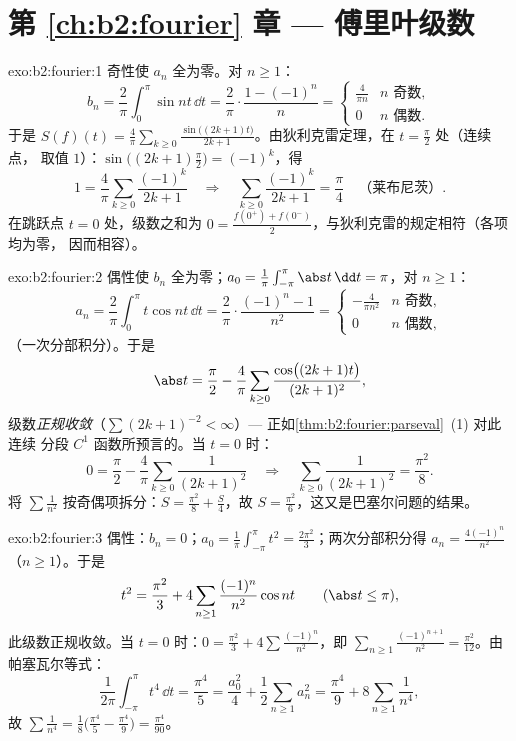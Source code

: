 \section*{第 \ref{ch:b2:fourier} 章 --- 傅里叶级数}

\begin{solution}{exo:b2:fourier:1}
奇性使 $a_n$ 全为零。对 $n \geq 1$：
\[
b_n = \frac{2}{\pi}\int_0^{\pi} \sin nt\,\dd t
= \frac{2}{\pi}\cdot\frac{1 - (-1)^n}{n}
= \begin{cases} \frac{4}{\pi n} & n \text{ 奇数},\\ 0 & n
\text{ 偶数}. \end{cases}
\]
于是 $S(f)(t) = \frac{4}{\pi}\sum_{k\geq0} \frac{\sin\bigl((2k+1)t
\bigr)}{2k+1}$。由狄利克雷定理，在 $t = \frac\pi2$ 处（连续点，
取值 $1$）：$\sin\bigl((2k+1)\frac\pi2\bigr) = (-1)^k$，得
\[
1 = \frac4\pi \sum_{k\geq0}\frac{(-1)^k}{2k+1}
\quad\Longrightarrow\quad
\sum_{k\geq0}\frac{(-1)^k}{2k+1} = \frac{\pi}{4}
\quad\text{（莱布尼茨）}.
\]
在跳跃点 $t = 0$ 处，级数之和为 $0 = \frac{f(0^+) +
f(0^-)}{2}$，与狄利克雷的规定相符（各项均为零，
因而相容）。
\end{solution}

\begin{solution}{exo:b2:fourier:2}
偶性使 $b_n$ 全为零；$a_0 = \frac{1}{\pi}\int_{-\pi}^\pi\abs
t\,\dd t = \pi$，对 $n \geq 1$：
\[
a_n = \frac{2}{\pi}\int_0^\pi t\cos nt\,\dd t
= \frac{2}{\pi}\cdot\frac{(-1)^n - 1}{n^2}
= \begin{cases} -\frac{4}{\pi n^2} & n \text{ 奇数},\\ 0 & n
\text{ 偶数}, \end{cases}
\]
（一次分部积分）。于是
\[
\abs t = \frac{\pi}{2} - \frac{4}{\pi}\sum_{k\geq0}
\frac{\cos\bigl((2k+1)t\bigr)}{(2k+1)^2} ,
\]
级数\emph{正规收敛}（$\sum (2k+1)^{-2} < \infty$）---
正如\cref{thm:b2:fourier:parseval}~(1) 对此连续
分段 $C^1$ 函数所预言的。当 $t = 0$ 时：
\[
0 = \frac\pi2 - \frac4\pi\sum_{k\geq0}\frac{1}{(2k+1)^2}
\quad\Longrightarrow\quad
\sum_{k\geq0}\frac{1}{(2k+1)^2} = \frac{\pi^2}{8} .
\]
将 $\sum \frac{1}{n^2}$ 按奇偶项拆分：$S =
\frac{\pi^2}{8} + \frac S4$，故 $S = \frac{\pi^2}{6}$，这又是巴塞尔问题的结果。
\end{solution}

\begin{solution}{exo:b2:fourier:3}
偶性：$b_n = 0$；$a_0 = \frac{1}{\pi}\int_{-\pi}^{\pi} t^2 =
\frac{2\pi^2}{3}$；两次分部积分得 $a_n =
\frac{4(-1)^n}{n^2}$（$n \geq 1$）。于是
\[
t^2 = \frac{\pi^2}{3} + 4\sum_{n\geq1}
\frac{(-1)^n}{n^2}\cos nt
\qquad (\abs t \leq \pi),
\]
此级数正规收敛。当 $t = 0$ 时：$0 = \frac{\pi^2}{3} +
4\sum\frac{(-1)^n}{n^2}$，即 $\sum_{n\geq1}
\frac{(-1)^{n+1}}{n^2} = \frac{\pi^2}{12}$。由帕塞瓦尔等式：
\[
\frac{1}{2\pi}\int_{-\pi}^{\pi} t^4\,\dd t = \frac{\pi^4}{5}
= \frac{a_0^2}{4} + \frac12\sum_{n\geq1} a_n^2
= \frac{\pi^4}{9} + 8\sum_{n\geq1}\frac{1}{n^4} ,
\]
故 $\sum \frac{1}{n^4} = \frac18\bigl(\frac{\pi^4}{5} -
\frac{\pi^4}{9}\bigr) = \frac{\pi^4}{90}$。
\end{solution}

